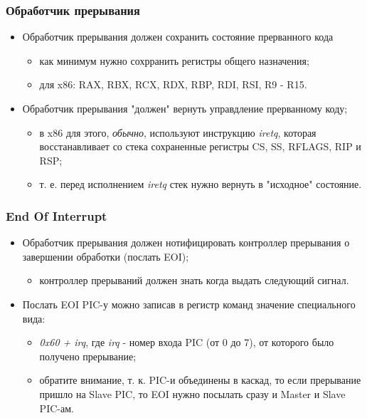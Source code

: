 \begin{frame}
\frametitle{Обработчик прерывания}
\begin{itemize}
  \item Обработчик прерывания должен сохранить состояние прерванного кода
  \begin{itemize}
    \item как минимум нужно сохрранить регистры общего назначения;
    \item для x86: RAX, RBX, RCX, RDX, RBP, RDI, RSI, R9 - R15.
  \end{itemize}
  \item Обработчик прерывания "должен" вернуть управдление прерванному коду;
  \begin{itemize}
    \item в x86 для этого, \emph{обычно}, используют инструкцию \emph{iretq},
    которая восстанавливает со стека сохраненные регистры CS, SS, RFLAGS, RIP и
    RSP;
    \item т. е. перед исполнением \emph{iretq} стек нужно вернуть в "исходное"
    состояние.
  \end{itemize}
\end{itemize}
\end{frame}

\begin{frame}
\frametitle{End Of Interrupt}
\begin{itemize}
  \item Обработчик прерывания должен нотифицировать контроллер прерывания о
  завершении обработки (послать EOI);
  \begin{itemize}
    \item контроллер прерываний должен знать когда выдать следующий сигнал.
  \end{itemize}
  \item Послать EOI PIC-у можно записав в регистр команд значение специального
  вида:
  \begin{itemize}
    \item \emph{0x60 + irq}, где \emph{irq} - номер входа PIC (от 0 до 7), от
    которого было получено прерывание;
    \item обратите внимание, т. к. PIC-и объединены в каскад, то если прерывание
    пришло на Slave PIC, то EOI нужно посылать сразу и Master и Slave PIC-ам.
  \end{itemize}
\end{itemize}
\end{frame}

